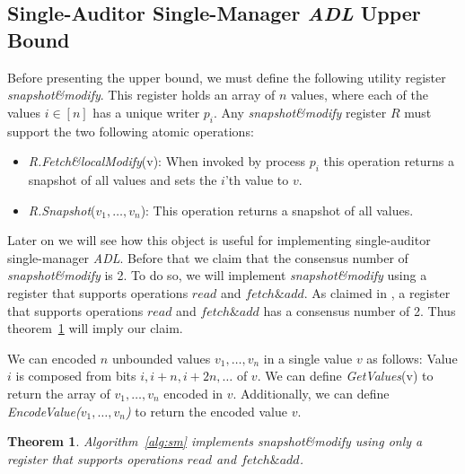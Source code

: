 \documentclass[11pt]{article}
\newtheorem{theorem}{Theorem}
\theoremstyle{definition}
\begin{document}
\subsection{Single-Auditor Single-Manager \textit{ADL} Upper Bound}

Before presenting the upper bound, we must define the following utility register \textit{snapshot\&modify}. This register holds an array of $n$ values, where each of the values $i\in [n]$ has a unique writer $p_i$. Any \textit{snapshot\&modify} register $R$ must support the two following atomic operations:
\begin{itemize}
    \item \textit{R.Fetch\&localModify}(v): When invoked by process $p_i$ this operation returns a snapshot of all values and sets the $i$'th value to $v$. 
    \item \textit{R.Snapshot}($v_1,\ldots,v_n$): This operation returns a snapshot of all values.
\end{itemize}

Later on we will see how this object is useful for implementing single-auditor single-manager \textit{ADL}. Before that we claim that the consensus number of \textit{snapshot\&modify} is 2. To do so, we will implement \textit{snapshot\&modify} using a register that supports operations $read$ and $fetch\&add$. As claimed in \cite{herlihy1991wait}, a register that supports operations $read$ and $fetch\&add$ has a consensus number of 2. Thus theorem~\ref{thm:sm} will imply our claim.

We can encoded $n$ unbounded values $v_1,\ldots,v_n$ in a single value $v$ as follows: Value $i$ is composed from bits $i,i+n,i+2n,\ldots$ of $v$. We can define \textit{GetValues}(v) to return the array of $v_1,\ldots,v_n$ encoded in $v$. Additionally, we can define \textit{EncodeValue($v_1,\ldots,v_n$)} to return the encoded value $v$.

\begin{theorem}
    \label{thm:sm} Algorithm~\ref{alg:sm} implements \textit{snapshot\&modify} using only a register that supports operations $read$ and $fetch\&add$.
\end{theorem}
\end{document}
